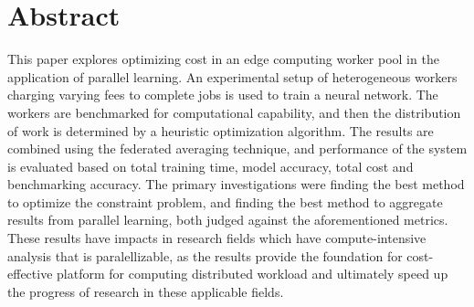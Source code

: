 \documentclass[../mthe-493-final-project.tex]{subfiles}
\begin{document}
    \chapter{Abstract}
    \label{ch:abstract}
    
    This paper explores optimizing cost in an edge computing worker pool in the application of parallel learning. An experimental setup of  heterogeneous workers charging varying fees to complete jobs is used to train a neural network. The workers are benchmarked for computational capability, and then the distribution of work is determined by a heuristic optimization algorithm. The results are combined using the federated averaging technique, and performance of the system is evaluated based on total training time, model accuracy, total cost and benchmarking accuracy. The primary investigations were finding the best method to optimize the constraint problem, and finding the best method to aggregate results from parallel learning, both judged against the aforementioned metrics. These results have impacts in research fields which have compute-intensive analysis that is paralellizable, as the results provide the foundation for cost-effective platform for computing distributed workload and ultimately speed up the progress of research in these applicable fields. 
\end{document}
